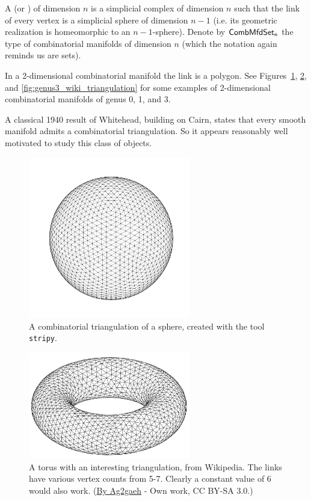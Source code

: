 \begin{mydef}
A  (or ) of dimension \( n \) is a simplicial complex of dimension \( n \) such that the link of every vertex is a simplicial sphere of dimension \( n-1 \) (i.e. its geometric realization is homeomorphic to an \( n-1 \)-sphere). Denote by \( \mathsf{CombMfdSet_n} \) the type of combinatorial manifolds of dimension \( n \) (which the notation again reminds us are sets).
\end{mydef}

In a 2-dimensional combinatorial manifold the link is a polygon. See Figures~\ref{fig:sphere_triangulation}, \ref{fig:torus_wiki_triangulation}, and \ref{fig:genus3_wiki_triangulation} for some examples of 2-dimensional combinatorial manifolds of genus 0, 1, and 3.

A classical 1940 result of Whitehead, building on Cairn, states that every smooth manifold admits a combinatorial triangulation\cite{whitehead_triangulation}. So it appears reasonably well motivated to study this class of objects.

\begin{figure}[htbp]
\centering
\includegraphics[width=200pt]{triangulated_sphere.pdf}
\caption{A combinatorial triangulation of a sphere, created with the tool \texttt{stripy}.}
\label{fig:sphere_triangulation}
\end{figure}

\begin{figure}[htbp]
\centering
\includegraphics[width=200pt]{Torus-triang.png}
\caption{A torus with an interesting triangulation, from Wikipedia. The links have various vertex counts from 5-7. Clearly a constant value of 6 would also work. (\href{https://commons.wikimedia.org/w/index.php?curid=30856793}{By Ag2gaeh} - Own work, CC BY-SA 3.0.)}
\label{fig:torus_wiki_triangulation}
\end{figure}


